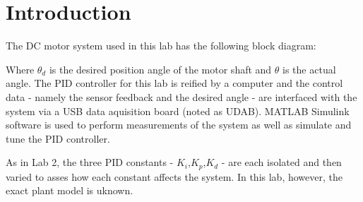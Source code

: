 \documentclass[main.tex]{subfile}
\begin{document}
\section{Introduction} 
\label{sec:intro}

The DC motor system used in this lab has the following block diagram: 



Where $\theta_d$ is the desired position angle of the motor shaft and $\theta$
is the actual angle. The PID controller for this lab is reified by a computer
and the control data - namely the sensor feedback and the desired angle - are
interfaced with the system via a USB data aquisition board (noted as UDAB).
MATLAB Simulink software is used to perform measurements of the system as well
as simulate and tune the PID controller. 

As in Lab 2, the three PID constants - $K_i$,$K_p$,$K_d$ - are each isolated and
then varied to asses how each constant affects the system. In this lab, however,
the exact plant model is uknown.

\end{document}
